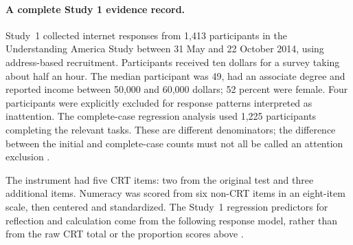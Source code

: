 \paragraph{A complete Study 1 evidence record.}
Study~1 collected internet responses from 1,413 participants in the Understanding
America Study between 31 May and 22 October 2014, using address-based recruitment.
Participants received ten dollars for a survey taking about half an hour.
The median participant was 49, had an associate degree and reported income
between 50,000 and 60,000 dollars; 52 percent were female. Four participants
were explicitly excluded for response patterns interpreted as inattention.
The complete-case regression analysis used 1,225 participants completing the
relevant tasks. These are different denominators; the difference between the
initial and complete-case counts must not all be called an attention exclusion
\cite[pp.~4--7]{SinayevPeters2015Calculation}.

The instrument had five CRT items: two from the original test and three
additional items. Numeracy was scored from six non-CRT items in an eight-item
scale, then centered and standardized. The Study~1 regression predictors for
reflection and calculation come from the following response model, rather than
from the raw CRT total or the proportion scores above
\cite[pp.~4--7]{SinayevPeters2015Calculation}.

